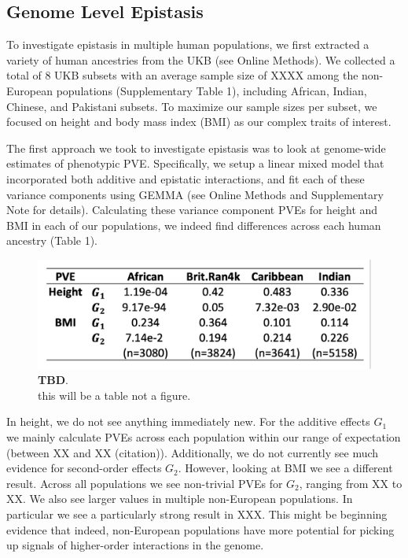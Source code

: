 \documentclass[12pt, a4paper]{article}
\begin{document}
\subsection{Genome Level Epistasis}\label{InterPath-Results-GenomeEpistasis}

To investigate epistasis in multiple human populations, we first extracted a variety of human ancestries from the UKB (see Online Methods). We collected a total of 8 UKB subsets with an average sample size of XXXX among the non-European populations (Supplementary Table 1), including African, Indian, Chinese, and Pakistani subsets. To maximize our sample sizes per subset, we focused on height and body mass index (BMI) as our complex traits of interest. 

The first approach we took to investigate epistasis was to look at genome-wide estimates of phenotypic PVE. Specifically, we setup a linear mixed model that incorporated both additive and epistatic interactions, and fit each of these variance components using GEMMA \citep{Zhou2012} (see Online Methods and Supplementary Note for details). Calculating these variance component PVEs for height and BMI in each of our populations, we indeed find differences across each human ancestry (Table 1).

\begin{figure}[ht]
\centering
\includegraphics[scale=1]{Images/Table1_Placeholder.png}
\caption[TBD]{\textbf{TBD}. \\ this will be a table not a figure.}
\label{IntrePath-Main-Table-GEMMA}
\end{figure}

In height, we do not see anything immediately new. For the additive effects $G_1$ we mainly calculate PVEs across each population within our range of expectation (between XX and XX (citation)). Additionally, we do not currently see much evidence for second-order effects $G_2$. However, looking at BMI we see a different result. Across all populations we see non-trivial PVEs for $G_2$, ranging from XX to XX. We also see larger values in multiple non-European populations. In particular we see a particularly strong result in XXX. This might be beginning evidence that indeed, non-European populations have more potential for picking up signals of higher-order interactions in the genome.   

\fi
\end{document}
